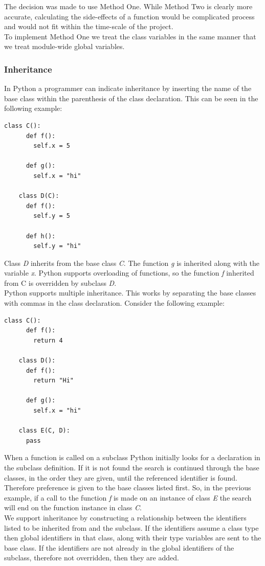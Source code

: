 \documentclass[12pt, titlepage]{article}
\begin{document}
The decision was made to use Method One. While Method Two is clearly more accurate, calculating the side-effects of a function would be complicated process and would not fit within the time-scale of the project. \\
\indent To implement Method One we treat the class variables in the same manner that we treat module-wide global variables.


\subsubsection{Inheritance}
In Python a programmer can indicate inheritance by inserting the name of the base class within the parenthesis of the class declaration. This can be seen in the following example:
\begin{lstlisting}[mathescape]
	class C():
	  def f():
	    self.x = 5
		
	  def g():
	    self.x = "hi"

	class D(C):
	  def f():
	    self.y = 5
		
	  def h():
	    self.y = "hi"
\end{lstlisting}
Class \textit{D} inherits from the base class \textit{C}. The function \textit{g} is inherited along with the variable \textit{x}. Python supports overloading of functions, so the function \textit{f} inherited from C is overridden by subclass \textit{D}. \\
\indent Python supports multiple inheritance. This works by separating the base classes with commas in the class declaration. Consider the following example: 
\begin{lstlisting}[mathescape]
	class C():
	  def f():
	    return 4
	    
	class D():
	  def f():
	    return "Hi"
	    
	  def g():
	    self.x = "hi"

	class E(C, D):
	  pass
\end{lstlisting}
When a function is called on a subclass Python initially looks for a declaration in the subclass definition. If it is not found the search is continued through the base classes, in the order they are given, until the referenced identifier is found. Therefore preference is given to the base classes listed first. So, in the previous example, if a call to the function \textit{f} is made on an instance of class \textit{E} the search will end on the function instance in class \textit{C}. \\
\indent We support inheritance by constructing a relationship between the identifiers listed to be inherited from and the subclass. If the identifiers assume a class type then global identifiers in that class, along with their type variables are sent to the base class. If the identifiers are not already in the global identifiers of the subclass, therefore not overridden, then they are added. \\
\end{document}
